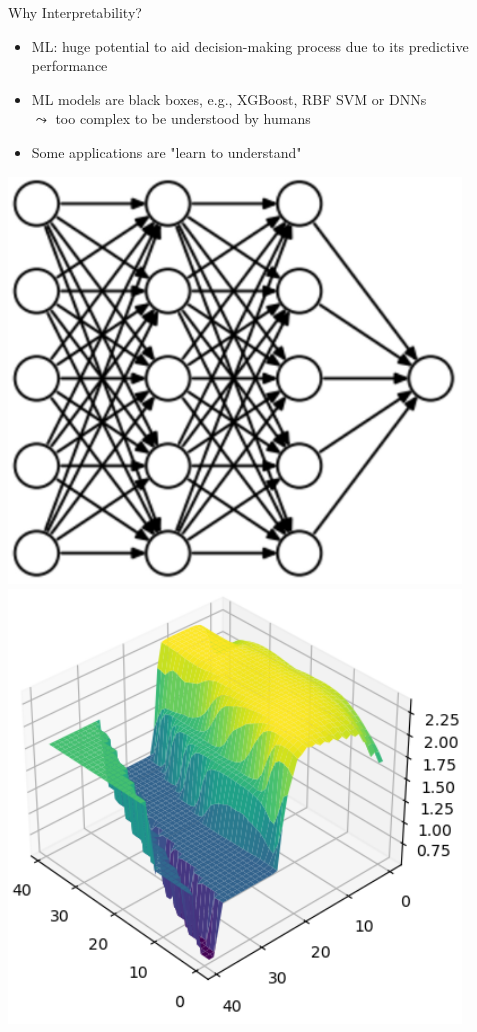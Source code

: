 \documentclass[10pt,compress,t,notes=noshow, xcolor=table]{beamer}
\begin{document}
\begin{frame}{Why Interpretability?}
\begin{splitVCC}[0.8]{
\begin{itemize}
    \item ML: huge potential to aid decision-making process due to its predictive performance
    \item ML models are black boxes, e.g., XGBoost, RBF SVM or DNNs \\ 
    $\leadsto$ too complex to be understood by humans
    \item Some applications are "learn to understand"
\end{itemize}
}
{
    \centering
    \includegraphics[width=0.9\textwidth]{figure/nn_model.png}
    \includegraphics[width=0.9\textwidth]{figure/nn_landscape.png}
}
\end{splitVCC}
\end{frame}
\end{document}
